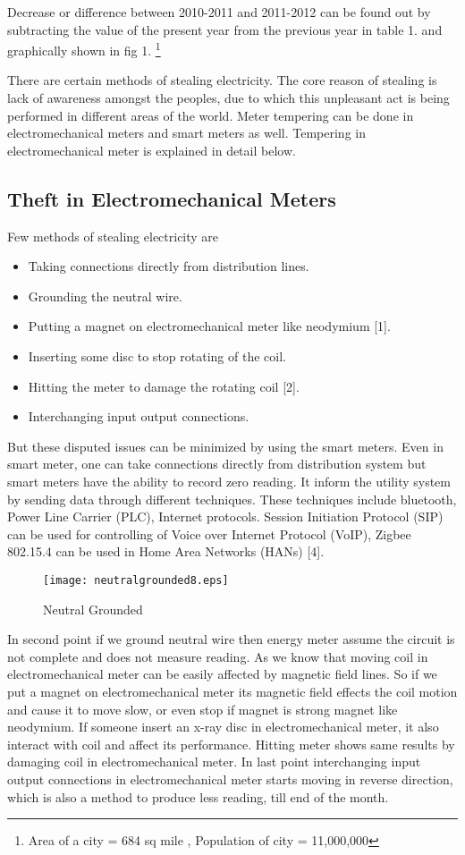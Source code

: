\documentclass[10pt, conference, compsocconf]{IEEEtran}
\begin{document}
Decrease or difference between 2010-2011 and 2011-2012 can be found out by subtracting the value of the present year from the previous year in table 1. and graphically shown in fig 1.
\footnote {Area of a city = 684 sq mile , Population of city = 11,000,000}

There are certain methods of stealing electricity. The core reason of stealing is lack of awareness amongst the peoples, due to which this unpleasant act is being performed in different areas of the world. Meter tempering can be done in electromechanical meters and smart meters as well. Tempering in electromechanical meter is explained in detail below.

\subsection{Theft in Electromechanical Meters}
Few methods of stealing electricity are
\begin{itemize}
\item
Taking connections directly from distribution lines.
\item
Grounding the neutral wire.
\item
Putting a magnet on electromechanical meter like neodymium [1].
\item
Inserting some disc to stop rotating of the coil.
\item
Hitting the meter to damage the rotating coil [2].
\item
Interchanging input output connections.
\end{itemize}

But these disputed issues can be minimized by using the smart meters. Even in smart meter, one can take connections directly from distribution system but smart meters
have the ability to record zero reading. It inform the utility system by sending data through different techniques. These techniques include bluetooth, Power Line Carrier (PLC), Internet protocols. Session Initiation Protocol (SIP) can be used for controlling of Voice over Internet Protocol (VoIP), Zigbee 802.15.4 can be used in Home Area Networks (HANs) [4].

\begin{figure*}[t]
\centering
\texttt{[image: neutralgrounded8.eps]}
\caption{Neutral Grounded}
\end{figure*}

In second point if we ground neutral wire then energy meter assume the circuit is not complete and does not measure reading. As we know that moving coil in electromechanical meter can be easily affected by magnetic field lines. So if we put a magnet on electromechanical meter its magnetic field effects the coil motion and cause it to move slow, or even stop if magnet is strong magnet like neodymium. If someone insert an x-ray disc in electromechanical meter, it also interact with coil and affect its performance. Hitting meter shows same results by damaging coil in electromechanical meter. In last point interchanging input output connections in electromechanical meter starts moving in reverse direction, which is also a method to produce less reading, till end of the month.
\end{document}
